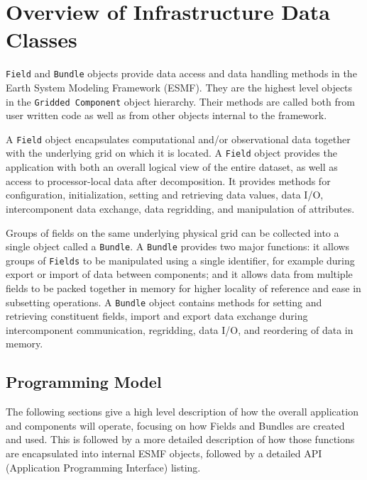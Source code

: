 
\section{Overview of Infrastructure Data Classes}

{\tt Field} and {\tt Bundle} objects provide 
data access and data handling methods
in the Earth System Modeling Framework (ESMF).
They are the highest level objects in the
{\tt Gridded Component} object hierarchy.
Their methods are called both from user written
code as well as from other objects internal to the framework.

A {\tt Field} 
object encapsulates computational and/or observational data together 
with the underlying grid on which it is located.  
A {\tt Field} object provides the
application with both an overall logical view of the entire
dataset, as well as access to processor-local data after decomposition.
It provides methods for configuration, initialization, setting and
retrieving data values, data I/O, intercomponent data 
exchange, data regridding, and manipulation of attributes.

Groups of fields on the same underlying physical grid 
can be collected into a single
object called a {\tt Bundle}.  
A {\tt Bundle} provides two major functions: it allows groups of 
{\tt Fields}
to be manipulated using a single identifier, for example during
export or import of data between components; and it allows
data from multiple fields to be packed together in memory 
for higher locality of reference and ease in subsetting operations.
A {\tt Bundle} object contains methods
for setting and retrieving constituent fields, import and export
data exchange during intercomponent communication,
regridding, data I/O, and reordering of data in memory.





\subsection{Programming Model}

The following sections give a high level description of how
the overall application and components will operate,
focusing on how Fields and Bundles are created and used.
This is followed by a more detailed description of how
those functions are encapsulated into internal ESMF 
objects, followed by a detailed API (Application Programming
Interface) listing.

